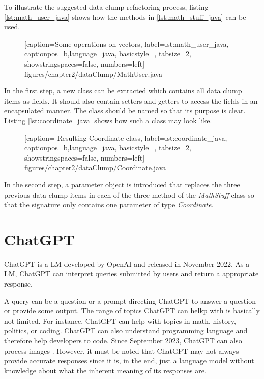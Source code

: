To illustrate the suggested data clump refactoring process, listing \ref{lst:math_user_java} shows how the methods in \ref{lst:math_stuff_java} can be used. 


  \begin{figure} [htbp!]
			
			[caption={Some operations on vectors},
			label={lst:math_user_java},
			captionpos=b,language=java, basicstyle=\footnotesize, tabsize=2, showstringspaces=false,  numbers=left]
			{figures/chapter2/dataClump/MathUser.java}
	\end{figure}

In the first step, a new class can be extracted which contains all data clump items as fields. It should also contain setters and getters to access the fields in an encapsulated manner. The class should be named so that its purpose is clear. Listing \ref{lst:coordinate_java} shows how such a class may look like. 

  \begin{figure} [htbp!]
			
			[caption={ Resulting Coordinate class},
			label={lst:coordinate_java},
			captionpos=b,language=java, basicstyle=\footnotesize, tabsize=2, showstringspaces=false,  numbers=left]
			{figures/chapter2/dataClump/Coordinate.java}
		\end{figure}

In the second step, a parameter object is introduced that replaces the three previous data clump items in each of the three method of the \textit{MathStuff} class so that the signature only contains one parameter of type \textit{Coordinate}.


\section{ChatGPT}

ChatGPT \cite{ChatGPT_url} is a \ac{LM} developed by OpenAI and released in November 2022. As a \ac{LM}, ChatGPT can interpret queries submitted by users and return a appropriate response. 

A query can be a question or a prompt directing ChatGPT to answer a question or provide some output. The range of topics ChatGPT can helkp with is basically not limited. For instance, ChatGPT can help with topics in math, history, politics, or coding. ChatGPT can also understand programming language and therefore help developers to code.  Since September 2023, ChatGPT can also process images \cite{ChatGPT_image}. However, it must be noted that ChatGPT may not always provide accurate responses since it is, in the end, just a language model without knowledge about what the inherent meaning of its responses are. 

